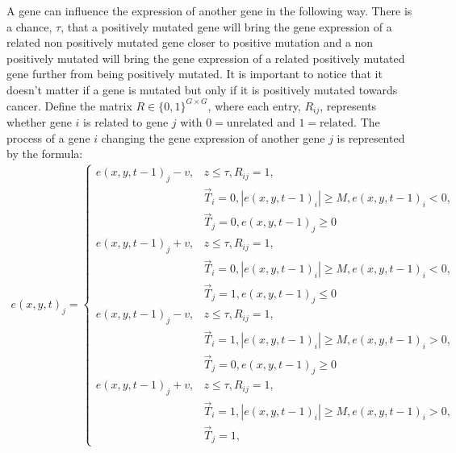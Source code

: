 \documentclass[\main/thesis.tex]{subfiles}
\begin{document}
A gene can influence the expression of another gene in the following way. 
There is a chance, $\tau$, that a positively mutated gene will bring the gene 
expression of a related non positively mutated gene closer to positive 
mutation and a non positively mutated will bring the gene expression of a 
related positively mutated gene further from being positively mutated.
It is important to notice that it doesn't matter if a gene is mutated but only
if it is positively mutated towards cancer. Define the matrix $R {\in} \{ 0, 1 
\}^{G{\times}G}$, where each entry, $R_{ij}$, represents whether gene $i$ is 
related to gene $j$ with $0{=}\text{unrelated}$ and $1{=}\text{related}$. The 
process of a gene $i$ changing the gene expression of another gene $j$ is 
represented by the formula:
\begin{align*}
e(x, y, t)_j {=} \begin{cases}
                   e(x, y, t{-}1)_j {-} v,
                     & z {\le} \tau, R_{ij} {=} 1, \\ 
                     & \vec{T}_i {=} 0,
                       |e(x, y, t{-}1)_i| {\ge} M,
                       e(x, y, t{-}1)_i {<} 0, \\
                     & \vec{T}_j {=} 0,
                       e(x, y, t{-}1)_j {\ge} 0 \\
                   e(x, y, t{-}1)_j {+} v,
                     & z {\le} \tau, R_{ij} {=} 1, \\
                     & \vec{T}_i {=} 0,
                       |e(x, y, t{-}1)_i| {\ge} M,
                       e(x, y, t{-}1)_i {<} 0, \\
                     & \vec{T}_j {=} 1,
                       e(x, y, t{-}1)_j {\le} 0 \\
                   e(x, y, t{-}1)_j {-} v,
                     & z {\le} \tau, R_{ij} {=} 1, \\ 
                     & \vec{T}_i {=} 1,
                       |e(x, y, t{-}1)_i| {\ge} M,
                       e(x, y, t{-}1)_i {>} 0, \\
                     & \vec{T}_j {=} 0,
                       e(x, y, t{-}1)_j {\ge} 0 \\
                   e(x, y, t{-}1)_j {+} v,
                     & z {\le} \tau, R_{ij} {=} 1, \\ 
                     & \vec{T}_i {=} 1,
                       |e(x, y, t{-}1)_i| {\ge} M,
                       e(x, y, t{-}1)_i {>} 0, \\
                     & \vec{T}_j {=} 1,

\end{cases}
\end{align*}
\end{document}
